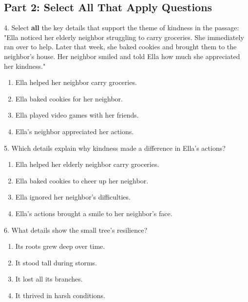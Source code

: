 \documentclass[12pt]{article}
\begin{document}
\vspace{1cm}

\subsection*{Part 2: Select All That Apply Questions}

4. Select \textbf{all} the key details that support the theme of kindness in the passage:\\
"Ella noticed her elderly neighbor struggling to carry groceries. She immediately ran over to help. Later that week, she baked cookies and brought them to the neighbor’s house. Her neighbor smiled and told Ella how much she appreciated her kindness."\\
\begin{enumerate}[label=\Alph*.]
    \item Ella helped her neighbor carry groceries.  
    \item Ella baked cookies for her neighbor.  
    \item Ella played video games with her friends.  
    \item Ella’s neighbor appreciated her actions.  
\end{enumerate}

\vspace{1cm}

5. Which details explain why kindness made a difference in Ella’s actions?\\
\begin{enumerate}[label=\Alph*.]
    \item Ella helped her elderly neighbor carry groceries.  
    \item Ella baked cookies to cheer up her neighbor.  
    \item Ella ignored her neighbor’s difficulties.  
    \item Ella’s actions brought a smile to her neighbor’s face.  
\end{enumerate}

\vspace{1cm}

6. What details show the small tree’s resilience?\\
\begin{enumerate}[label=\Alph*.]
    \item Its roots grew deep over time.  
    \item It stood tall during storms.  
    \item It lost all its branches.  
    \item It thrived in harsh conditions.  
\end{enumerate}
\end{document}
